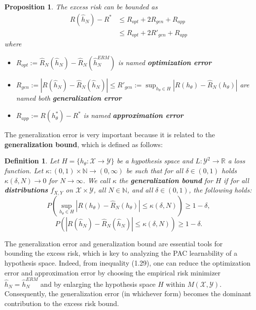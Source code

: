 \documentclass{report}
\newtheorem{definition}{Definition}[chapter]
\newtheorem{proposition}{Proposition}[chapter]
\begin{document}
\begin{proposition}
The excess risk can be bounded as
\begin{equation}
\begin{split}
R(\hat{h}_N)-R^* & \leq R_{opt} + 2R_{gen} + R_{app}\\
  &\leq R_{opt} + 2R'_{gen} + R_{app}
\end{split}
\end{equation}
where
\begin{itemize}
\item $R_{opt} := \hat{R}_N(\hat{h}_N)-\hat{R}_N(\hat{h}^{ERM}_N)$ is named \textbf{optimization error}
\item $R_{gen} := |R(\hat{h}_N)-\hat{R}_N(\hat{h}_N)| \leq R'_{gen} := \sup_{h_{\theta} \in H}|R(h_\theta)-\hat{R}_N(h_\theta)|$ are named both \textbf{generalization error}
\item $R_{app} := R(h^*_\theta)-R^*$ is named \textbf{approximation error}
\end{itemize}
\end{proposition}

The generalization error is very important because it is related to the \textbf{generalization bound}, which is defined as follows:

\begin{definition}
Let $H = \{h_\theta : \mathcal{X} \to \mathcal{Y}\}$ be a hypothesis space and $L:\mathcal{Y}^2 \to \mathbb{R}$ a loss function. Let $\kappa : (0,1) \times \mathbb{N} \to (0,\infty)$ be such that for all $\delta \in (0,1)$ holds $\kappa(\delta, N) \to 0$ for $N \to \infty$. We call $\kappa$ the \textbf{generalization bound} for $H$ if for all \textbf{distributions} $f_{X,Y}$ on $\mathcal{X} \times \mathcal{Y}$, all $N \in \mathbb{N}$, and all $\delta \in (0,1)$, the following holds:
\begin{equation}
P\left(\sup_{h_{\theta} \in H}|R(h_\theta)-\hat{R}_N(h_\theta)|\leq \kappa(\delta, N)\right) \geq 1-\delta,
\end{equation}
\begin{equation}
P\left(|R(\hat{h}_N)-\hat{R}_N(\hat{h}_N)|\leq \kappa(\delta, N)\right) \geq 1-\delta.
\end{equation}
\end{definition}

The generalization error and generalization bound are essential tools for bounding the excess risk, which is key to analyzing the PAC learnability of a hypothesis space. Indeed, from inequality (1.29), one can reduce the optimization error and approximation error by choosing the empirical risk minimizer $\hat{h}_N = \hat{h}^{ERM}_N$ and by enlarging the hypothesis space $H$ within $M(\mathcal{X}, \mathcal{Y})$. Consequently, the generalization error (in whichever form) becomes the dominant contribution to the excess risk bound.
\end{document}
